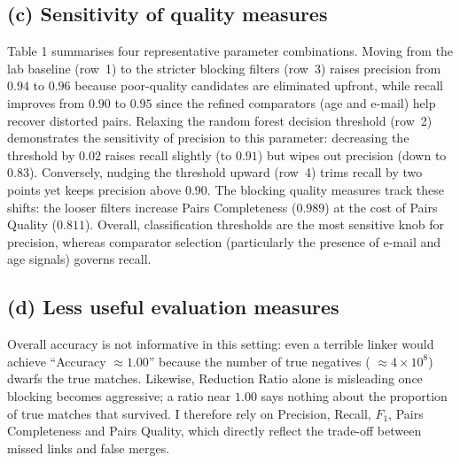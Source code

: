 \documentclass[11pt]{article}
\begin{document}
\subsection*{(c) Sensitivity of quality measures}
Table 1 summarises four representative parameter combinations. Moving from the lab baseline (row~1) to the stricter blocking filters (row~3) raises precision from $0.94$ to $0.96$ because poor-quality candidates are eliminated upfront, while recall improves from $0.90$ to $0.95$ since the refined comparators (age and e-mail) help recover distorted pairs. Relaxing the random forest decision threshold (row~2) demonstrates the sensitivity of precision to this parameter: decreasing the threshold by $0.02$ raises recall slightly (to $0.91$) but wipes out precision (down to $0.83$). Conversely, nudging the threshold upward (row~4) trims recall by two points yet keeps precision above $0.90$. The blocking quality measures track these shifts: the looser filters increase Pairs Completeness ($0.989$) at the cost of Pairs Quality ($0.811$). Overall, classification thresholds are the most sensitive knob for precision, whereas comparator selection (particularly the presence of e-mail and age signals) governs recall.

\subsection*{(d) Less useful evaluation measures}
Overall accuracy is not informative in this setting: even a terrible linker would achieve ``Accuracy $\approx 1.00$'' because the number of true negatives ( $\approx 4 \times 10^{8}$) dwarfs the true matches. Likewise, Reduction Ratio alone is misleading once blocking becomes aggressive; a ratio near $1.00$ says nothing about the proportion of true matches that survived. I therefore rely on Precision, Recall, $F_{1}$, Pairs Completeness and Pairs Quality, which directly reflect the trade-off between missed links and false merges.
\end{document}
